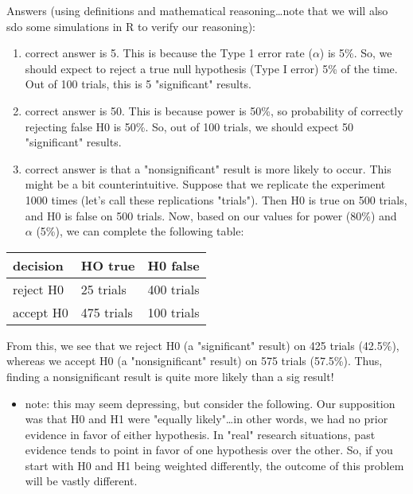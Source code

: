 \documentclass[11pt]{article}
\begin{document}
Answers (using definitions and mathematical reasoning\ldots{}note that we will also sdo some simulations in R to verify our reasoning):

\begin{enumerate}
\item correct answer is 5.  This is because the Type 1 error rate ($\alpha$) is 5\%.  So, we should expect to reject a true null hypothesis (Type I error) 5\% of the time.  Out of 100 trials, this is 5 "significant" results.

\item correct answer is 50.  This is because power is 50\%, so probability of correctly rejecting false H0 is 50\%.  So, out of 100 trials, we should expect 50 "significant" results.

\item correct answer is that a "nonsignificant" result is more likely to occur.  This might be a bit counterintuitive.  Suppose that we replicate the experiment 1000 times (let's call these replications "trials").  Then H0 is true on 500 trials, and H0 is false on 500 trials.  Now, based on our values for power (80\%) and $\alpha$ (5\%), we can complete the following table:
\end{enumerate}

\begin{center}
\begin{tabular}{lll}
decision & HO true & H0 false\\
\hline
reject H0 & 25 trials & 400 trials\\
accept H0 & 475 trials & 100 trials\\
\end{tabular}
\end{center}

From this, we see that we reject H0 (a "significant" result) on 425 trials (42.5\%), whereas we accept H0 (a "nonsignificant" result) on 575 trials (57.5\%).  Thus, finding a nonsignificant result is quite more likely than a sig result!

\begin{itemize}
\item note: this may seem depressing, but consider the following.  Our supposition was that H0 and H1 were "equally likely"\ldots{}in other words, we had no prior evidence in favor of either hypothesis.  In "real" research situations, past evidence tends to point in favor of one hypothesis over the other.  So, if you start with H0 and H1 being weighted differently, the outcome of this problem will be vastly different.
\end{itemize}
\end{document}
